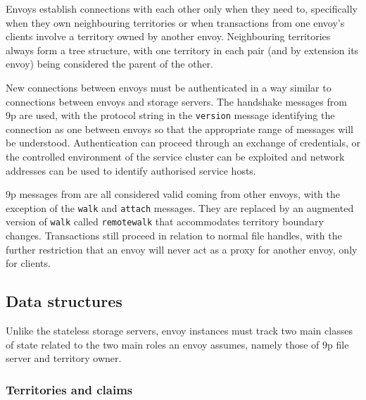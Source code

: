 Envoys establish connections with each other only when they need to, specifically when they own neighbouring territories or when transactions from one envoy's clients involve a territory owned by another envoy. Neighbouring territories always form a tree structure, with one territory in each pair (and by extension its envoy) being considered the parent of the other.

New connections between envoys must be authenticated in a way similar to connections between envoys and storage servers. The handshake messages from 9p are used, with the protocol string in the \texttt{version} message identifying the connection as one between envoys so that the appropriate range of messages will be understood. Authentication can proceed through an exchange of credentials, or the controlled environment of the service cluster can be exploited and network addresses can be used to identify authorised service hosts.

9p messages from  are all considered valid coming from other envoys, with the exception of the \texttt{walk} and \texttt{attach} messages. They are replaced by an augmented version of \texttt{walk} called \texttt{remotewalk} that accommodates territory boundary changes. Transactions still proceed in relation to normal file handles, with the further restriction that an envoy will never act as a proxy for another envoy, only for clients.

\subsection{Data structures}

Unlike the stateless storage servers, envoy instances must track two main classes of state related to the two main roles an envoy assumes, namely those of 9p file server and territory owner.

\subsubsection{Territories and claims}

